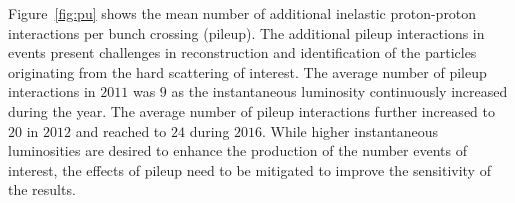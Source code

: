Figure~\ref{fig:pu} shows the mean number of additional inelastic proton-proton interactions per bunch crossing (pileup). The additional pileup interactions in events present challenges in reconstruction and identification of the particles originating from the hard scattering of interest. The average number of pileup interactions in $2011$ was $9$ as the instantaneous luminosity continuously increased during the year. The average number of pileup interactions further increased to $20$ in $2012$ and reached to $24$ during $2016$.  While higher instantaneous luminosities are desired to enhance the production of the number events of interest, the effects of pileup need to be mitigated to improve the sensitivity of the results. 



